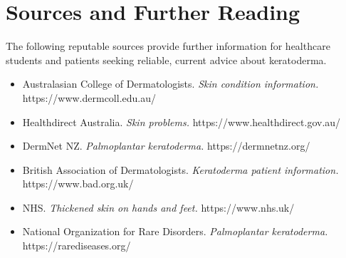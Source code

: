 \section*{Sources and Further Reading}
The following reputable sources provide further information for healthcare students and patients seeking reliable, current advice about keratoderma.
\begin{itemize}
    \item Australasian College of Dermatologists. \textit{Skin condition information.} https://www.dermcoll.edu.au/
    \item Healthdirect Australia. \textit{Skin problems.} https://www.healthdirect.gov.au/
    \item DermNet NZ. \textit{Palmoplantar keratoderma.} https://dermnetnz.org/
    \item British Association of Dermatologists. \textit{Keratoderma patient information.} https://www.bad.org.uk/
    \item NHS. \textit{Thickened skin on hands and feet.} https://www.nhs.uk/
    \item National Organization for Rare Disorders. \textit{Palmoplantar keratoderma.} https://rarediseases.org/
\end{itemize}
